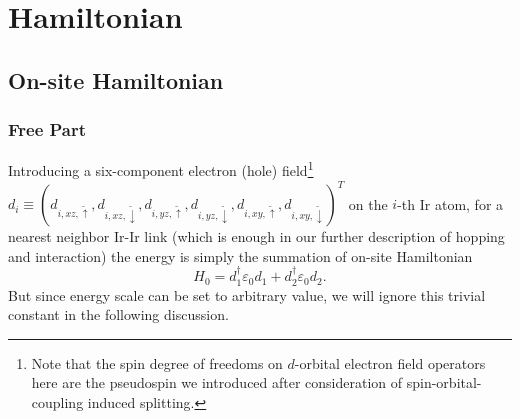 \documentclass[10pt,nofootinbib]{revtex4}
\begin{document}
\section{Hamiltonian}
	\subsection{On-site Hamiltonian}
		\subsubsection{Free Part}
			Introducing a six-component electron (hole) field\footnote{Note that the spin degree of freedoms on $d$-orbital electron field operators here are the pseudospin we introduced after consideration of spin-orbital-coupling induced splitting.} $d_i\equiv(d_{i,xz,\widetilde{\uparrow}},d_{i,xz,\widetilde{\downarrow}},d_{i,yz,\widetilde{\uparrow}},d_{i,yz,\widetilde{\downarrow}},d_{i,xy,\widetilde{\uparrow}},d_{i,xy,\widetilde{\downarrow}})^T$ on the $i$-th Ir atom, for a nearest neighbor Ir-Ir link (which is enough in our further description of hopping and interaction) the energy is simply the summation of on-site Hamiltonian
			\begin{equation}\label{2.1.1}
				H_0=d_1^\dagger \varepsilon_0 d_1+d_2^\dagger \varepsilon_0 d_2.
			\end{equation}
			But since  energy scale can be set to arbitrary value, we will ignore this trivial constant in the following discussion.
		
\end{document}
